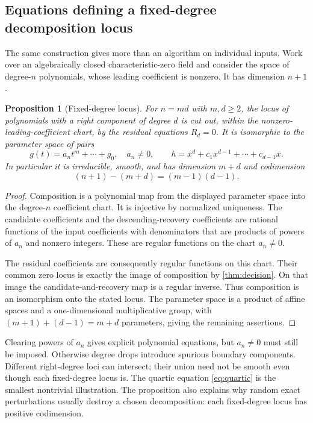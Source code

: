 \documentclass[11pt,a4paper]{article}
\newtheorem{proposition}[theorem]{Proposition}
\theoremstyle{definition}
\begin{document}
\subsection{Equations defining a fixed-degree decomposition locus}
The same construction gives more than an algorithm on individual inputs. Work over an algebraically closed characteristic-zero field and consider the space of degree-$n$ polynomials, whose leading coefficient is nonzero. It has dimension $n+1$.

\begin{proposition}[Fixed-degree locus]\label{prop:locus}
For $n=md$ with $m,d\ge2$, the locus of polynomials with a right component of degree $d$ is cut out, within the nonzero-leading-coefficient chart, by the residual equations $R_d=0$. It is isomorphic to the parameter space of pairs
\[
 g(t)=a_nt^m+\cdots+g_0,\quad a_n\ne0,
 \qquad h=x^d+c_1x^{d-1}+\cdots+c_{d-1}x.
\]
In particular it is irreducible, smooth, and has dimension $m+d$ and codimension
\[
 (n+1)-(m+d)=(m-1)(d-1).
\]
\end{proposition}
\begin{proof}
Composition is a polynomial map from the displayed parameter space into the degree-$n$ coefficient chart. It is injective by normalized uniqueness. The candidate coefficients and the descending-recovery coefficients are rational functions of the input coefficients with denominators that are products of powers of $a_n$ and nonzero integers. These are regular functions on the chart $a_n\ne0$.

The residual coefficients are consequently regular functions on this chart. Their common zero locus is exactly the image of composition by \cref{thm:decision}. On that image the candidate-and-recovery map is a regular inverse. Thus composition is an isomorphism onto the stated locus. The parameter space is a product of affine spaces and a one-dimensional multiplicative group, with $(m+1)+(d-1)=m+d$ parameters, giving the remaining assertions.
\end{proof}

Clearing powers of $a_n$ gives explicit polynomial equations, but $a_n\ne0$ must still be imposed. Otherwise degree drops introduce spurious boundary components. Different right-degree loci can intersect; their union need not be smooth even though each fixed-degree locus is. The quartic equation \eqref{eq:quartic} is the smallest nontrivial illustration. The proposition also explains why random exact perturbations usually destroy a chosen decomposition: each fixed-degree locus has positive codimension.
\end{document}
